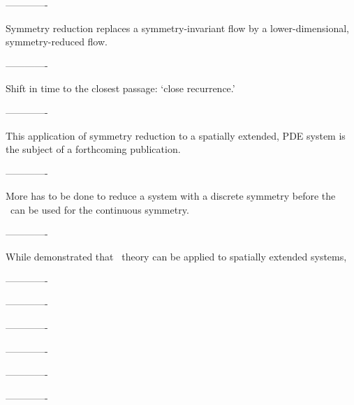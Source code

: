 -------------

Symmetry reduction replaces a symmetry-invariant flow by a
lower-dimensional, symmetry-reduced flow.

-------------

Shift in time to the closest passage:
`close recurrence.'

-------------

This application of symmetry reduction to a spatially extended, PDE
system is the subject of a forthcoming publication.

-------------

More has to be done to reduce a system with a discrete
symmetry before the \mslices\ can be used for the continuous symmetry.

-------------

While  demonstrated that \po\ theory can be
applied to spatially extended systems,

-------------

-------------

-------------

-------------

-------------

-------------
